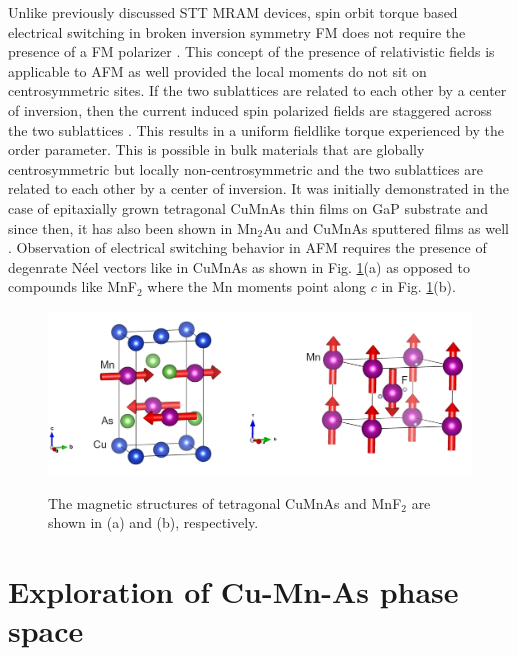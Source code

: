 \documentclass[10pt,doublespacing,edeposit]{uiucthesis2020}
\begin{document}
\begin{mainmatter}
Unlike previously discussed STT MRAM devices, spin orbit torque based electrical switching in broken inversion symmetry FM does not require the presence of a FM polarizer \cite{Manchon2008}. This concept of the presence of relativistic fields is applicable to AFM as well provided the local moments do not sit on centrosymmetric sites. If the two sublattices are related to each other by a center of inversion, then the current induced spin polarized fields are staggered across the two sublattices \cite{Zelezny2014,Zelezny2017,Wadley2016}. This results in a uniform fieldlike torque experienced by the order parameter. This is possible in bulk materials that are globally centrosymmetric but locally non-centrosymmetric and the two sublattices are related to each other by a center of inversion. It was initially demonstrated in the case of epitaxially grown tetragonal CuMnAs thin films on GaP substrate \cite{Wadley2016} and since then, it has also been shown in Mn$_2$Au and CuMnAs sputtered films as well \cite{Meinert2018,Matalla-Wagner2019}. Observation of electrical switching behavior in AFM requires the presence of degenrate N\'eel vectors like in CuMnAs as shown in Fig. \ref{fig:tet-CuMnAs}(a) as opposed to compounds like MnF$_2$ where the Mn moments point along $c$ in Fig. \ref{fig:tet-CuMnAs}(b).


\begin{figure}
\centering\includegraphics[width=\columnwidth]{figures/ch1/CuMnAs-MnF2.png} \\
\caption{\label{fig:tet-CuMnAs}
The magnetic structures of tetragonal CuMnAs and MnF$_2$ are shown in (a) and (b), respectively.
}
\end{figure}

\section{Exploration of Cu-Mn-As phase space}


\end{mainmatter}
\end{document}
